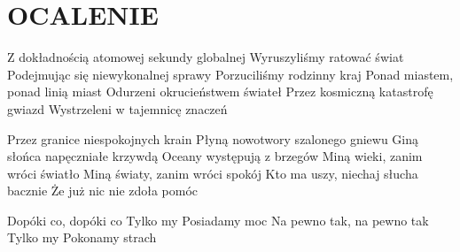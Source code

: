 \documentclass[../../../songbook.tex]{subfiles}
\begin{document}
\TabPositions{8cm} %
\section*{OCALENIE}
{}
\vspace{0.5cm}
Z dokładnością atomowej sekundy globalnej	 \newline
Wyruszyliśmy ratować świat					 \newline
Podejmując się niewykonalnej sprawy \newline
Porzuciliśmy rodzinny kraj \newline
Ponad miastem, ponad linią miast \newline
Odurzeni okrucieństwem świateł \newline
Przez kosmiczną katastrofę gwiazd \newline
Wystrzeleni w tajemnicę znaczeń \newline

Przez granice niespokojnych krain \newline
Płyną nowotwory szalonego gniewu \newline
Giną słońca napęczniałe krzywdą \newline
Oceany występują z brzegów \newline
Miną wieki, zanim wróci światło \newline
Miną światy, zanim wróci spokój \newline
Kto ma uszy, niechaj słucha bacznie \newline
Że już nic nie zdoła pomóc \newline

\-\hspace{1cm} Dopóki co, dopóki co		 \newline
\-\hspace{1cm} Tylko my					 \newline
\-\hspace{1cm} Posiadamy moc			 \newline
\-\hspace{1cm} Na pewno tak, na pewno tak		 \newline
\-\hspace{1cm} Tylko my					 \newline
\-\hspace{1cm} Pokonamy strach			 \newline
\end{document}
